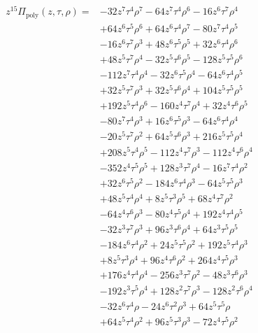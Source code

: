 {\small
\begin{align*}
z^{15}\Pi_{\mathrm{poly}}(z,\tau,\rho)={}&-32z^{7} \tau^{4} \rho^{7}-64z^{7} \tau^{4} \rho^{6}-16z^{6} \tau^{7} \rho^{4}\\
&+64z^{6} \tau^{5} \rho^{6}+64z^{6} \tau^{4} \rho^{7}-80z^{7} \tau^{4} \rho^{5}\\
&-16z^{6} \tau^{7} \rho^{3}+48z^{6} \tau^{5} \rho^{5}+32z^{6} \tau^{4} \rho^{6}\\
&+48z^{5} \tau^{7} \rho^{4}-32z^{5} \tau^{6} \rho^{5}-128z^{5} \tau^{5} \rho^{6}\\
&-112z^{7} \tau^{4} \rho^{4}-32z^{6} \tau^{5} \rho^{4}-64z^{6} \tau^{4} \rho^{5}\\
&+32z^{5} \tau^{7} \rho^{3}+32z^{5} \tau^{6} \rho^{4}+104z^{5} \tau^{5} \rho^{5}\\
&+192z^{5} \tau^{4} \rho^{6}-160z^{4} \tau^{7} \rho^{4}+32z^{4} \tau^{6} \rho^{5}\\
&-80z^{7} \tau^{4} \rho^{3}+16z^{6} \tau^{5} \rho^{3}-64z^{6} \tau^{4} \rho^{4}\\
&-20z^{5} \tau^{7} \rho^{2}+64z^{5} \tau^{6} \rho^{3}+216z^{5} \tau^{5} \rho^{4}\\
&+208z^{5} \tau^{4} \rho^{5}-112z^{4} \tau^{7} \rho^{3}-112z^{4} \tau^{6} \rho^{4}\\
&-352z^{4} \tau^{5} \rho^{5}+128z^{3} \tau^{7} \rho^{4}-16z^{7} \tau^{4} \rho^{2}\\
&+32z^{6} \tau^{5} \rho^{2}-184z^{6} \tau^{4} \rho^{3}-64z^{5} \tau^{5} \rho^{3}\\
&+48z^{5} \tau^{4} \rho^{4}+8z^{5} \tau^{3} \rho^{5}+68z^{4} \tau^{7} \rho^{2}\\
&-64z^{4} \tau^{6} \rho^{3}-80z^{4} \tau^{5} \rho^{4}+192z^{4} \tau^{4} \rho^{5}\\
&-32z^{3} \tau^{7} \rho^{3}+96z^{3} \tau^{6} \rho^{4}+64z^{3} \tau^{5} \rho^{5}\\
&-184z^{6} \tau^{4} \rho^{2}+24z^{5} \tau^{5} \rho^{2}+192z^{5} \tau^{4} \rho^{3}\\
&+8z^{5} \tau^{3} \rho^{4}+96z^{4} \tau^{6} \rho^{2}+264z^{4} \tau^{5} \rho^{3}\\
&+176z^{4} \tau^{4} \rho^{4}-256z^{3} \tau^{7} \rho^{2}-48z^{3} \tau^{6} \rho^{3}\\
&-192z^{3} \tau^{5} \rho^{4}+128z^{2} \tau^{7} \rho^{3}-128z^{2} \tau^{6} \rho^{4}\\
&-32z^{6} \tau^{4} \rho-24z^{6} \tau^{2} \rho^{3}+64z^{5} \tau^{5} \rho\\
&+64z^{5} \tau^{4} \rho^{2}+96z^{5} \tau^{3} \rho^{3}-72z^{4} \tau^{5} \rho^{2}\\

\end{align*}}
